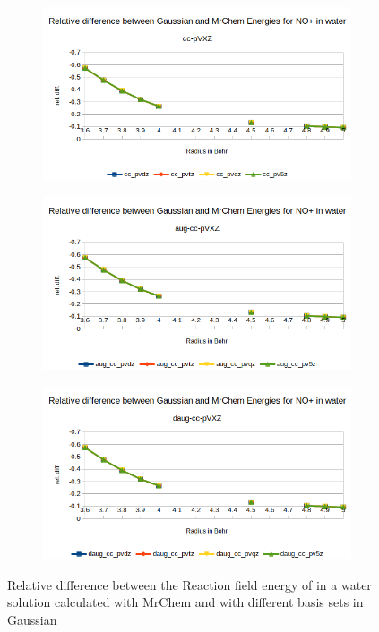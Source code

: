 \documentclass[../master_thesis.tex]{subfiles}
\begin{document}
\begin{figure}[h!]
  \centering
  \begin{subfigure}[b]{0.75\linewidth}
    \includegraphics[width=\linewidth]{img/nopreldiff.png}
  \end{subfigure}
  \begin{subfigure}[b]{0.75\linewidth}
    \includegraphics[width=\linewidth]{img/nopaugreldiff.png}
  \end{subfigure}
  \begin{subfigure}[b]{0.75\linewidth}
    \includegraphics[width=\linewidth]{img/nopdaugreldiff.png}
  \end{subfigure}
  \caption{Relative difference between the Reaction field energy of  in a water solution calculated with MrChem
  and with different basis sets in Gaussian}
  \label{fig:nopreldiff}
\end{figure}
\end{document}
